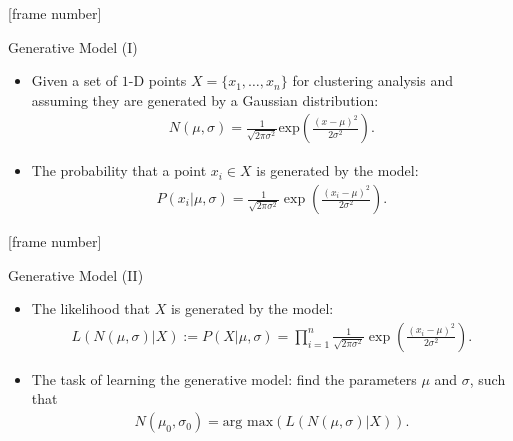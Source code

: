 \documentclass[aspectratio=169,t,xcolor=dvipsnames]{beamer}
\begin{document}
  {
    [frame number]
    \begin{frame}{Generative Model (I)}
      \centering
      \begin{itemize}
        \item Given a set of $1$-D points $X = \{x_1, \ldots, x_n\}$ for clustering analysis and assuming they are generated by a Gaussian distribution:
        \begin{align}
          N(\mu,\sigma) = \frac{1}{\sqrt{2 \pi \sigma^2}} \text{exp}\left({\frac{(x-\mu)^2}{2\sigma^2}}\right).
        \end{align}
        \item The probability that a point $x_i \in X$ is generated by the model:
        \begin{align}
          P(x_i \vert \mu, \sigma) = \frac{1}{\sqrt{2\pi\sigma^2}} \exp\left( \frac{(x_i-\mu)^2}{2\sigma^2}\right).
        \end{align}
      \end{itemize}
    \end{frame}
  }

  {
    [frame number]
    \begin{frame}{Generative Model (II)}
      \centering
      \begin{itemize}
        \item The likelihood that $X$ is generated by the model:
        \begin{align}
          L(N(\mu,\sigma) \vert X) := P(X \vert \mu, \sigma) = \prod_{i=1}^{n} \frac{1}{\sqrt{2\pi\sigma^2}} \exp\left( \frac{(x_i-\mu)^2}{2\sigma^2}\right).
        \end{align}
        \item The task of learning the generative model: find the parameters $\mu$ and $\sigma$, such that
        \begin{align}
          N(\mu_0,\sigma_0) = \text{arg max}\left( L(N(\mu,\sigma)\vert X) \right).
        \end{align}
      \end{itemize}
    \end{frame}
  }
\end{document}
